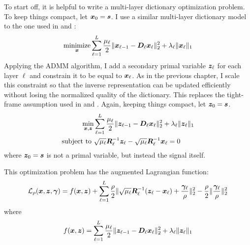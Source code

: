 To start off, it is helpful to write a multi-layer dictionary optimization problem. To keep things compact, let $\bm{x}_0 = \bm{s}$. I use a similar multi-layer dictionary model to the one used in \cite{murdock2018deep} and \cite{chodosh2018deep}:
%
\begin{equation}
\operatorname*{\text{minimize}}_{\bm{x}} \sum_{\ell = 1}^{L} \frac{\mu_{\ell}}{2}\|\bm{x}_{\ell - 1} -\bm{D}_{\ell}\bm{x}_{\ell}\|_2^2 + \lambda_{\ell}\|\bm{x}_{\ell}\|_1
\end{equation}
%
Applying the ADMM algorithm, I add a secondary primal variable $\bm{z}_{\ell}$ for each layer $\ell$ and constrain it to be equal to $\bm{x}_{\ell}$. As in the previous chapter, I scale this constraint so that the inverse representation can be updated efficiently without losing the normalized quality of the dictionary. This replaces the tight-frame assumption used in \cite{murdock2018deep} and \cite{chodosh2018deep}. Again, keeping things compact, let $\bm{z}_0 = \bm{s}$.
%
\begin{equation}
\begin{aligned}
\min_{\bm{x},\bm{z}} & \sum_{\ell = 1}^{L} \frac{\mu_{\ell}}{2}\|\bm{z}_{\ell - 1} -\bm{D}_{\ell}\bm{x}_{\ell}\|_2^2 + \lambda_{\ell}\|\bm{z}_{\ell}\|_1 \\
\text{subject to } & \sqrt{\mu_{\ell}}\bm{R}_{\ell}^{-1}\bm{z}_{\ell} - \sqrt{\mu_{\ell}}\bm{R}_{\ell}^{-1}\bm{x}_{\ell} = 0
\end{aligned}
\end{equation}
%
where $\bm{z}_0 = \bm{s}$ is not a primal variable, but instead the signal itself.

This optimization problem has the augmented Lagrangian function:
%
\begin{equation}
\mathcal{L}_{\rho}(\bm{x},\bm{z},\bm{\gamma}) = f(\bm{x},\bm{z})  +  \sum_{\ell = 1}^L \frac{\rho}{2}\|\sqrt{\mu_{\ell}}\bm{R}_{\ell}^{-1}(\bm{z}_{\ell} - \bm{x}_{\ell}) + \frac{\bm{\gamma}_{\ell}}{\rho}\|_2^2  - \frac{\rho}{2}\|\frac{\bm{\gamma}_{\ell}}{\rho}\|_2^2
\end{equation}
%
where 
\begin{equation}
f(\bm{x},\bm{z}) = \sum_{\ell = 1}^{L} \frac{\mu_{\ell}}{2}\|\bm{z}_{\ell - 1} -\bm{D}_{\ell}\bm{x}_{\ell}\|_2^2 + \lambda_{\ell}\|\bm{z}_{\ell}\|_1
\end{equation}

